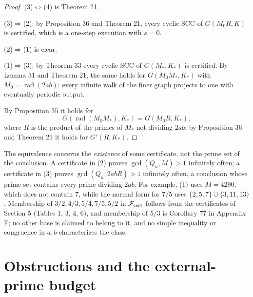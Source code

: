 \documentclass[11pt,reqno]{amsart}
\theoremstyle{definition}
\theoremstyle{remark}
\begin{document}
\begin{proof}\leavevmode\label{proof:37}
(3)\(\Leftrightarrow\)(4) is Theorem 21.

(3)\(\Rightarrow\)(2): by Proposition 36 and
Theorem 21, every cyclic SCC of \(G(M_0R,K)\) is certified, which is a
one-step execution with \(s=0\).

(2)\(\Rightarrow\)(1) is clear.

(1)\(\Rightarrow\)(3): by
Theorem 33 every cyclic SCC of \(G(M_*,K_*)\) is certified. By Lemma 31
and Theorem 21, the same holds for \(G(M_0M_*,K_*)\) with
\(M_0=\operatorname{rad}(2ab)\): every infinite walk of the finer graph
projects to one with eventually periodic output.

By Proposition 35 it
holds for
\[
G(\operatorname{rad}(M_0M_*),K_*)=G(M_0R,K_*),
\]
where \(R\)
is the product of the primes of \(M_*\) not dividing \(2ab\); by
Proposition 36 and Theorem 21 it holds for \(G'(R,K_*)\). \qedhere
\end{proof}

The equivalence concerns the \emph{existence} of some certificate, not the
prime set of the conclusion. A certificate in (2) proves
\(\gcd(Q_n,M)>1\) infinitely often; a certificate in (3) proves
\(\gcd(Q_n,2abR)>1\) infinitely often, a conclusion whose prime set
contains every prime dividing \(2ab\). For example, (1) uses
\(M=4290\), which does not contain \(7\), while the normal form for
\(7/5\) uses \(\{2,5,7\}\cup\{3,11,13\}\). Membership of
\(3/2,4/3,5/4,7/5,5/2\) in \(\mathcal F_{\rm cert}\) follows from the
certificates of Section 5 (Tables 1, 3, 4, 6), and membership of \(5/3\)
is Corollary 77 in Appendix F; no other base is claimed
to belong to it, and no simple inequality or congruence in \(a,b\)
characterizes the class.

\section{Obstructions and the external-prime budget}\label{sec:8}
\end{document}
